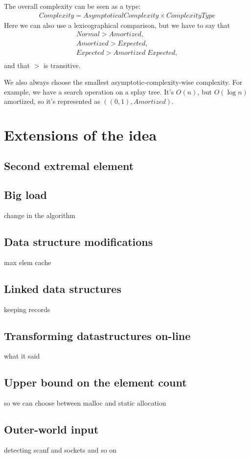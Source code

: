 \documentclass[11pt]{article}
\begin{document}
		The overall complexity can be seen as a type:
		\begin{eqnarray}
			Complexity = AsymptoticalComplexity \times ComplexityType
		\end{eqnarray}
		Here we can also use a lexicographical comparison, but we have to say that
		\begin{eqnarray}
			Normal > Amortized,\\
			Amortized > Expected,\\
			Expected > Amortized \; Expected,\\
		\end{eqnarray}
		and that $>$ is transitive.

		We also always choose the smallest asymptotic-complexity-wise complexity. For example, we have a search operation on a splay tree. It's $O(n)$, but $O(\log n)$ amortized, so it's represented as $((0,1),Amortized)$.


			

	   \section{Extensions of the idea}
	   \subsection{Second extremal element}
	   \subsection{Big load}
	   change in the algorithm
	   \subsection{Data structure modifications}
	   max elem cache
	   \subsection{Linked data structures}
	   keeping records
	   \subsection{Transforming datastructures on-line}
	   what it said
	   \subsection{Upper bound on the element count}
	   so we can choose between malloc and static allocation
	   \subsection{Outer-world input}
	   detecting scanf and sockets and so on
\end{document}
